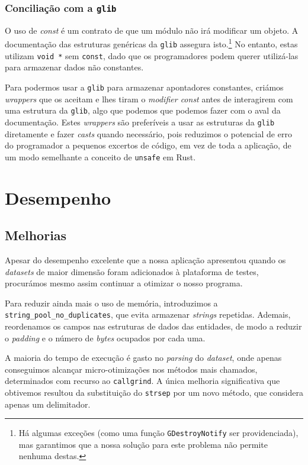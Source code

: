 \documentclass[12pt, a4paper]{article}
\begin{document}
\subsubsection{Conciliação com a \texttt{glib}}
\label{sec:glib-conciliation}

O uso de \emph{const} é um contrato de que um módulo não irá modificar um objeto. A documentação das
estruturas genéricas da \texttt{glib} assegura isto.\footnote{Há algumas exceções (como uma função
\texttt{GDestroyNotify} ser providenciada), mas garantimos que a nossa solução para este problema
não permite nenhuma destas.} No entanto, estas utilizam \texttt{void *} sem \texttt{const}, dado
que os programadores podem querer utilizá-las para armazenar dados não constantes.

Para podermos usar a \texttt{glib} para armazenar apontadores constantes, criámos \emph{wrappers}
que os aceitam e lhes tiram o \emph{modifier const} antes de interagirem com uma estrutura da
\texttt{glib}, algo que podemos que podemos fazer com o aval da documentação. Estes \emph{wrappers}
são preferíveis a usar as estruturas da \texttt{glib} diretamente e fazer \emph{casts} quando
necessário, pois reduzimos o potencial de erro do programador a pequenos excertos de código, em
vez de toda a aplicação, de um modo semelhante a conceito de \texttt{unsafe} em Rust.

\section{Desempenho}
\label{sec:performance}

\subsection{Melhorias}
\label{sec:performance-improvements}

Apesar do desempenho excelente que a nossa aplicação apresentou quando os \emph{datasets} de maior
dimensão foram adicionados à plataforma de testes, procurámos mesmo assim continuar a otimizar o
nosso programa.

Para reduzir ainda mais o uso de memória, introduzimos a \texttt{string\_pool\_no\_duplicates}, que
evita armazenar \emph{strings} repetidas. Ademais, reordenamos os campos nas estruturas de dados das
entidades, de modo a reduzir o \emph{padding} e o número de \emph{bytes} ocupados por cada uma.

A maioria do tempo de execução é gasto no \emph{parsing} do \emph{dataset}, onde apenas conseguimos
alcançar micro-otimizações nos métodos mais chamados, determinados com recurso ao
\texttt{callgrind}. A única melhoria significativa que obtivemos resultou da substituição do
\texttt{strsep} por um novo método, que considera apenas um delimitador.
\end{document}
